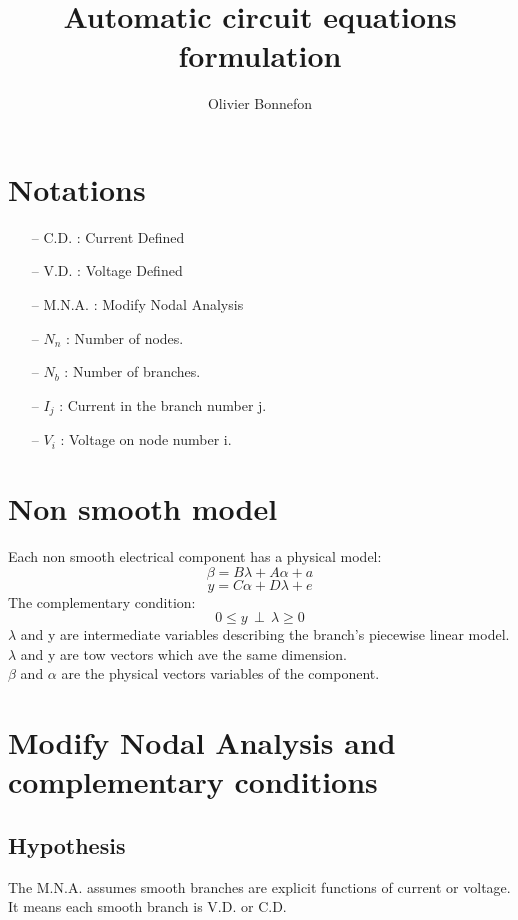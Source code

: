 \documentclass[10pt]{article}
\begin{document}
 \title{Automatic circuit equations formulation}
\author{Olivier Bonnefon}
\maketitle

\newpage
\tableofcontents
 \newpage
 \section{Notations}
\begin{itemize}
\item[--] C.D. : Current Defined
\item[--] V.D. : Voltage Defined
\item[--] M.N.A. : Modify Nodal Analysis
\end{itemize}
 \begin{itemize}
\item[--] $N_{n}$ : Number of nodes.
\item[--] $N_{b}$ : Number of branches.
\item[--] $I_{j}$ : Current in the branch number j.
\item[--] $V_{i}$ : Voltage on node number i. 
\end{itemize}

 \section{Non smooth model}
Each non smooth electrical component has a physical model:
\[\beta=B\lambda + A\alpha +a\]
\[y=C\alpha + D\lambda +e\]
The complementary condition:
\[0 \leq y \, \perp \, \lambda \geq 0\]
$\lambda$ and y are intermediate variables describing the branch's piecewise linear model.
$\lambda$ and y are tow vectors which ave the same dimension.\\
\newline
$\beta$ and $\alpha$ are the physical vectors variables of the component.\\
\newpage
\section{Modify Nodal Analysis and complementary conditions}
\subsection{Hypothesis\\}
The M.N.A. assumes smooth branches are explicit functions of current or voltage. It means each smooth
branch is V.D. or C.D.\\
\end{document}

